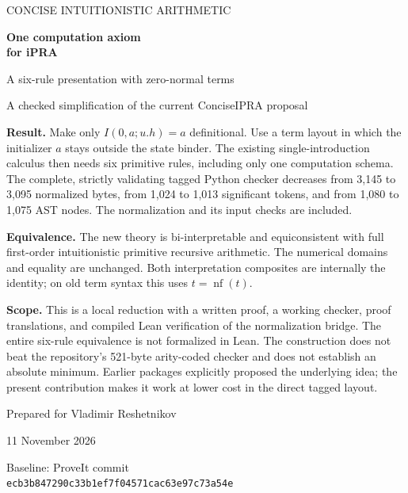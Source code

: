 \documentclass[11pt]{article}
\newcommand{\nf}{\operatorname{nf}}\newcommand{\It}{\widehat I}
\newcommand{\code}[1]{\nolinkurl{#1}}
\begin{document}
\begin{titlepage}
\vspace*{10mm}
{\large\color{muted}CONCISE INTUITIONISTIC ARITHMETIC\par}
\vspace{8mm}
{\Huge\bfseries\color{ink}One computation axiom\\[4pt]for iPRA\par}
\vspace{8mm}
{\LARGE A six-rule presentation with zero-normal terms\par}
\vspace{10mm}
{\large A checked simplification of the current ConciseIPRA proposal\par}
\vspace{13mm}
\begin{minipage}{0.94\textwidth}
\textbf{Result.}
Make only \(I(0,a;u.h)=a\) definitional. Use a term layout in which the
initializer \(a\) stays outside the state binder. The existing
single-introduction calculus then needs six primitive rules, including
only one computation schema. The complete, strictly validating tagged
Python checker decreases from 3,145 to 3,095 normalized bytes, from
1,024 to 1,013 significant tokens, and from 1,080 to 1,075 AST nodes.
The normalization and its input checks are included.

\medskip
\textbf{Equivalence.}
The new theory is bi-interpretable and equiconsistent with full
first-order intuitionistic primitive recursive arithmetic. The numerical
domains and equality are unchanged. Both interpretation composites are
internally the identity; on old term syntax this uses \(t=\nf(t)\).

\medskip
\textbf{Scope.}
This is a local reduction with a written proof, a working checker,
proof translations, and compiled Lean verification of the normalization
bridge. The entire six-rule equivalence is not formalized in Lean.
The construction does not beat the repository's 521-byte arity-coded
checker and does not establish an absolute minimum. Earlier packages
explicitly proposed the underlying idea; the present contribution
makes it work at lower cost in the direct tagged layout.
\end{minipage}
\vfill
{\large Prepared for Vladimir Reshetnikov\par}
{11 November 2026\par}\vspace{4mm}
{\small Baseline: ProveIt commit\\
\code{ecb3b847290c33b1ef7f04571cac63e97c73a54e}\par}
\end{titlepage}
\end{document}
